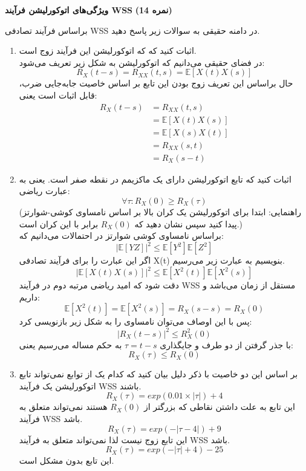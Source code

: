 \Large \textbf{ویژگی‌های اتوکورلیشن فرآیند WSS}
\large \textbf{(14 نمره)}

\normalsize \vspace{0.5cm}
براساس فرآیند تصادفی WSS در دامنه حقیقی به سوالات زیر پاسخ دهید.
\begin{enumerate}[label=(\alph*)]
	\item
اثبات کنید که که اتوکورلیشن این فرآیند زوج است.
\\
در فضای حقیقی می‌دانیم که اتوکورلیشن به شکل زیر تعریف می‌شود:
$$
R_X(t - s) = R_{XX}(t, s) = \mathbb{E}[X(t)X(s)]
$$
حال براساس این تعریف زوج بودن این تابع بر اساس خاصیت جابه‌جایی ضرب، قابل اثبات است یعنی:
\begin{align*}
	R_X(t - s) &= R_{XX}(t, s) \\
	&= \mathbb{E}[X(t)X(s)]\\
	&= \mathbb{E}[X(s)X(t)]\\
	&= R_{XX}(s, t)\\
	&= R_X(s - t)
\end{align*}
	\item
اثبات کنید که تابع اتوکورلیشن دارای یک ماکزیمم در نقطه صفر است. یعنی به عبارت ریاضی:
$$
\forall \tau : R_{X}(0) \geqslant R_X(\tau)
$$
(راهنمایی: ابتدا برای اتوکورلیشن یک کران بالا بر اساس نامساوی کوشی-شوارتز پیدا کنید سپس نشان دهید که 
$ R_X(0) $
برابر با این کران است.)
\\
براساس نامساوی کوشی شوارتز در احتمالات می‌دانیم که:
$$
|\mathbb{E}[YZ]|^2 \leqslant \mathbb{E}[Y^2]\mathbb{E}[Z^2]
$$
اگر این عبارت را برای فرآیند تصادفی X(t) بنویسیم به عبارت زیر می‌رسیم.
$$
|\mathbb{E}[X(t)X(s)]|^2 \leqslant \mathbb{E}[X^2(t)]\mathbb{E}[X^2(s)]
$$
دقت شود که امید ریاضی مرتبه دوم در فرآیند WSS مستقل از زمان می‌باشد و داریم:
$$
\mathbb{E}[X^2(t)] = \mathbb{E}[X^2(s)] = R_{X} (s - s) =  R_{X} (0) 
$$
پس با این اوصاف می‌توان نامساوی را به شکل زیر بازنویسی کرد:
$$
|R_X(t-s)|^2 \leqslant R_X^2 (0)
$$
با جذر گرفتن از دو طرف و جایگذاری 
$ \tau = t - s $
به حکم مساله می‌رسیم یعنی:
$$
R_X(\tau) \leqslant R_X (0)
$$
	\item 
بر اساس این دو خاصیت با ذکر دلیل بیان کنید که کدام یک از توابع نمی‌تواند تابع اتوکورلیشن یک فرآیند WSS باشند.
$$
R_X(\tau) = exp(0.01 \times |\tau|) + 4
$$
این تابع به علت داشتن نقاطی که بزرگتر از 
$ R_X(0)  $
هستند نمی‌تواند متعلق به فرآیند WSS باشد.
$$
R_X(\tau) = exp(-|\tau - 4|) + 9 
$$
این تابع زوج نیست لذا نمی‌تواند متعلق به فرآیند WSS باشد.
$$
R_X(\tau) = exp(-|\tau| + 4) - 25 
$$
این تابع بدون مشکل است.

\end{enumerate}


